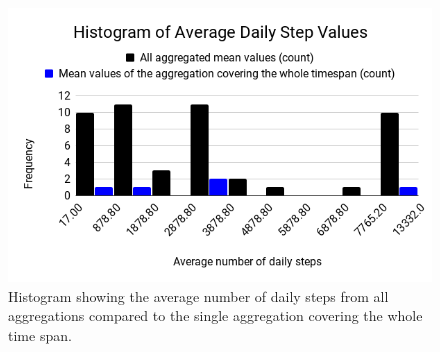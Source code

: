\begin{figure}[h!]
	\includegraphics[width=\textwidth]{data/diagrams/daily-step-diagram.png}
	\caption{Histogram showing the average number of daily steps from all aggregations compared to the single aggregation covering the whole time span.}
	\label{steps-diagram}
\end{figure}

